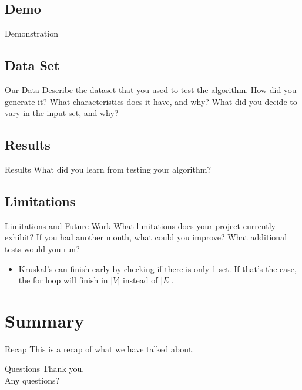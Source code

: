 \documentclass{beamer}
\begin{document}
\subsection{Demo}
\begin{frame}{Demonstration}
\end{frame}

\subsection{Data Set}
\begin{frame}{Our Data}
    Describe the dataset that you used to test the algorithm. How did you
    generate it? What characteristics does it have, and why? What did you
    decide to vary in the input set, and why?
\end{frame}

\subsection{Results}
\begin{frame}{Results}
    What did you learn from testing your algorithm?
\end{frame}

\subsection{Limitations}
\begin{frame}{Limitations and Future Work}
    What limitations does your project currently exhibit? If you had another
    month, what could you improve? What additional tests would you run?

    \begin{itemize}
    \item Kruskal's can finish early by checking if there is only 1 set. If
    that's the case, the for loop will finish in $|V|$ instead of $|E|$.
    \end{itemize}
\end{frame}


\section{Summary}\frame{\sectionpage}
\begin{frame}{Recap}
    This is a recap of what we have talked about.
\end{frame}

\begin{frame}{Questions}
    Thank you.\\
    Any questions?
\end{frame}
\end{document}
